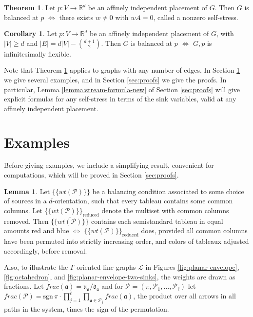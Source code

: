 \documentclass[11pt,letterpaper]{amsart}
\theoremstyle{definition}
\newtheorem{theorem}{Theorem}
\newtheorem{lemma}{Lemma}
\newtheorem{corollary}{Corollary}
\begin{document}
\begin{theorem}\label{thm:balanced-equivalent-to-selfstress}
    Let $p:V \to \mathbb{R}^d$ be an affinely independent placement of $G$. Then $G$ is balanced at $p$ $\iff$ there exists $w\neq 0$ with $wA = 0$, called a nonzero self-stress.
\end{theorem}

\begin{corollary}\label{cor:affine-Maxwell-infinitesimally-flexible}
    Let $p:V \to \mathbb{R}^d$ be an affinely independent placement of $G$, with $|V| \geq d$ and $|E| = d|V| - \binom{d+1}{2}$. Then $G$ is balanced at $p$ $\iff$ $G,p$ is infinitesimally flexible.
\end{corollary}

Note that Theorem \ref{thm:balanced-equivalent-to-selfstress} applies to graphs with any number of edges. In Section \ref{sec:examples} we give several examples, and in Section \ref{sec:proofs} we give the proofs. In particular, Lemma \ref{lemma:stream-formula-new} of Section \ref{sec:proofs} will give explicit formulas for any self-stress in terms of the sink variables, valid at any affinely independent placement.









\section{Examples}\label{sec:examples}

Before giving examples, we include a simplifying result, convenient for computations, which will be proved in Section \ref{sec:proofs}.

\begin{lemma}\label{lemma:remove-common-factors}
    Let $\{\{ wt(\mathcal{P}) \}\}$ be a balancing condition associated to some choice of sources in a $d$-orientation, such that every tableau contains some common columns. Let $\{\{ wt(\mathcal{P}) \}\}_{\text{reduced}}$ denote the multiset with common columns removed. Then $\overline{\{\{ wt(\mathcal{P}) \}\}}$ contains each semistandard tableau in equal amounts red and blue $\iff$ $\overline{\{\{ wt(\mathcal{P}) \}\}_{\text{reduced}}}$ does, provided all common columns have been permuted into strictly increasing order, and colors of tableaux adjusted accordingly, before removal.
\end{lemma}

Also, to illustrate the $\Gamma$-oriented line graphs $\mathcal{L}$ in Figures \ref{fig:planar-envelope}, \ref{fig:octahedron}, and \ref{fig:planar-envelope-two-sinks}, the weights are drawn as fractions. Let $frac(\mathfrak{a}) = \mathfrak{u}_\mathfrak{a} / \mathfrak{d}_\mathfrak{a}$ and for $\mathcal{P} = (\pi, \mathcal{P}_1,\dots, \mathcal{P}_\ell)$ let $frac(\mathcal{P}) = \text{sgn} \, \pi \cdot \prod_{j=1}^\ell \prod_{\mathfrak{a} \in \mathcal{P}_j} frac(\mathfrak{a})$, the product over all arrows in all paths in the system, times the sign of the permutation.
\end{document}
